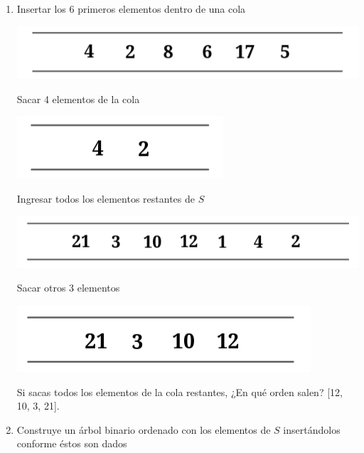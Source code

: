 \begin{enumerate}
       \item Insertar los 6 primeros elementos dentro de una cola
       \begin{center}
          \includegraphics[scale=0.3]{../Image/C1.png}
       \end{center}
       Sacar 4 elementos de la cola
       \begin{center}
          \includegraphics[scale=0.3]{../Image/C2.png}
       \end{center}
       Ingresar todos los elementos restantes de $S$
       \begin{center}
          \includegraphics[scale=0.3]{../Image/C3.png}
       \end{center}
       Sacar otros 3 elementos
       \begin{center}
          \includegraphics[scale=0.3]{../Image/C4.png}
       \end{center}
       Si sacas todos los elementos de la cola restantes, ¿En qué orden salen? [12, 10, 3, 21].
       \item Construye un árbol binario ordenado con los elementos de $S$ insertándolos conforme
       éstos son dados
       \begin{center}

\end{center}
\end{enumerate}
